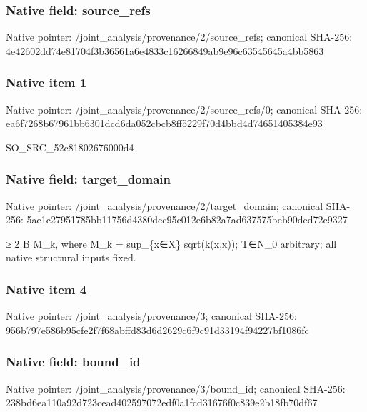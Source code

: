 \documentclass[10pt,a4paper]{article}
\begin{document}
\subsubsection{Native field: source\_\allowbreak{}refs}
Native pointer: /joint\_\allowbreak{}analysis/provenance/2/source\_\allowbreak{}refs; canonical SHA-256: 4e42602dd74e81704f3b36561a6e4833c16266849ab9e96c63545645a4bb5863

\subsubsection{Native item 1}
Native pointer: /joint\_\allowbreak{}analysis/provenance/2/source\_\allowbreak{}refs/0; canonical SHA-256: ea6f7268b67961bb6301dcd6da052cbcb8ff5229f70d4bbd4d74651405384e93

\begingroup\raggedright\sloppy SO\_\allowbreak{}SRC\_\allowbreak{}52c81802676000d4\par\endgroup

\subsubsection{Native field: target\_\allowbreak{}domain}
Native pointer: /joint\_\allowbreak{}analysis/provenance/2/target\_\allowbreak{}domain; canonical SHA-256: 5ae1c27951785bb11756d4380dcc95c012e6b82a7ad637575beb90ded72c9327

\begingroup\raggedright{}\allowbreak{} {\AtlasUnicodeSymbols ≥}\allowbreak{} 2 B M\_\allowbreak{}k,\allowbreak{} where M\_\allowbreak{}k =\allowbreak{} sup\_\allowbreak{}\{x{\AtlasUnicodeSymbols ∈}\allowbreak{}X\} sqrt(k(x,\allowbreak{}x));\allowbreak{} T{\AtlasUnicodeSymbols ∈}\allowbreak{}N\_\allowbreak{}0 arbitrary;\allowbreak{} all native structural inputs fixed.\par\endgroup

\subsubsection{Native item 4}
Native pointer: /joint\_\allowbreak{}analysis/provenance/3; canonical SHA-256: 956b797e586b95cfe2f7f68abffd83d6d2629c6f9c91d33194f94227bf1086fc

\subsubsection{Native field: bound\_\allowbreak{}id}
Native pointer: /joint\_\allowbreak{}analysis/provenance/3/bound\_\allowbreak{}id; canonical SHA-256: 238bd6ea110a92d723cead402597072edf0a1fcd31676f0c839e2b18fb70df67
\end{document}
